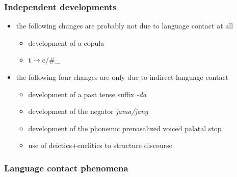 \documentclass[a4paper,12pt]{article}
\begin{document}
\subsubsection{Independent developments}
\begin{itemize}
 \item the following changes are probably not due to language contact at all
 \begin{itemize}
  \item development of a copula \citep{Nordhofffccopula}
  \item t$\to$c/\#\_ \citep{Nordhoff2009phd}
 \end{itemize}
 \item the following four changes are only due to indirect language contact \citep{NordhoffEtAl2007alt}
 \begin{itemize}
  \item development of a past tense suffix \em -da\em
  \item development of the negator \em jama/jang\em
  \item development of the phonemic prenasalized voiced palatal stop \unj
  \item use of deictics+enclitics to structure discourse
 \end{itemize}
\end{itemize}

\subsubsection{Language contact phenomena}
\end{document}
